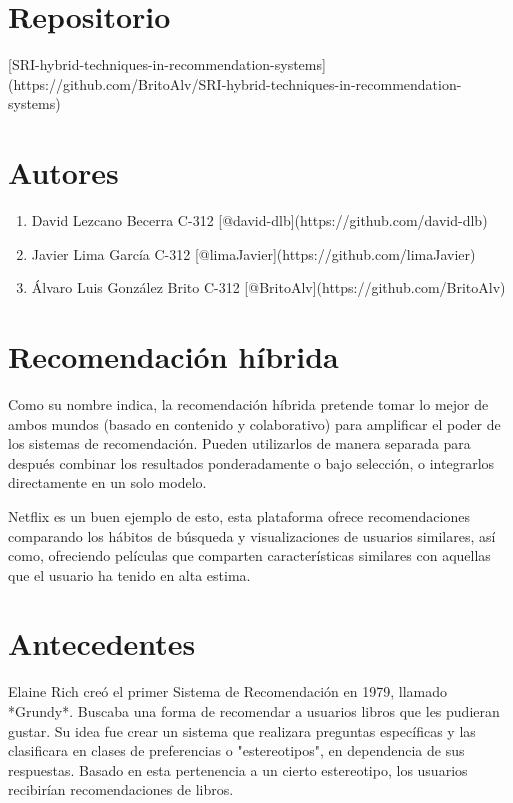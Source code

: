 \documentclass[14pt]{extarticle}
\begin{document}
\section{Repositorio}

[SRI-hybrid-techniques-in-recommendation-systems](https://github.com/BritoAlv/SRI-hybrid-techniques-in-recommendation-systems)

\section{Autores}
\begin{enumerate}
    \item David Lezcano Becerra C-312 [@david-dlb](https://github.com/david-dlb)
    \item Javier Lima García C-312 [@limaJavier](https://github.com/limaJavier)
    \item Álvaro Luis González Brito C-312 [@BritoAlv](https://github.com/BritoAlv)
\end{enumerate}


\section{Recomendación híbrida}

Como su nombre indica, la recomendación híbrida pretende tomar lo mejor de ambos mundos (basado en contenido y colaborativo) para amplificar el poder de los sistemas de recomendación. Pueden utilizarlos de manera separada para después combinar los resultados ponderadamente o bajo selección, o integrarlos directamente en un solo modelo.

Netflix es un buen ejemplo de esto, esta plataforma ofrece recomendaciones comparando los hábitos de búsqueda y visualizaciones de usuarios similares, así como, ofreciendo películas que comparten características similares con aquellas que el usuario ha tenido en alta estima.

\section{Antecedentes}

Elaine Rich creó el primer Sistema de Recomendación en 1979, llamado *Grundy*. Buscaba una forma de recomendar a usuarios libros que les pudieran gustar. Su idea fue crear un sistema que realizara preguntas específicas y las clasificara en clases de preferencias o "estereotipos", en dependencia de sus respuestas. Basado en esta pertenencia a un cierto estereotipo, los usuarios recibirían recomendaciones de libros.
\end{document}
